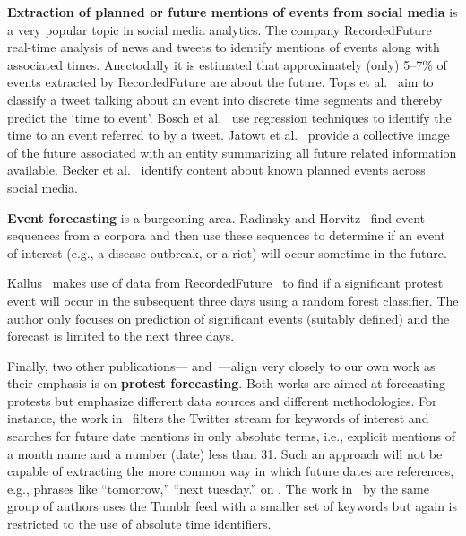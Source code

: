 {\bf Extraction of planned or future mentions of events from social media} is a very popular topic in social media
analytics.
The company 
RecordedFuture~\cite{recordedFuture}  real-time analysis of news and tweets to identify mentions of events along with associated times. Anectodally it is estimated that approximately (only) 5--7\% of events extracted 
by RecordedFuture are about the future.
Tops et al.~\cite{tops2013predicting} aim to classify a tweet talking about an event into discrete time segments and thereby predict the 
`time to event'.
Bosch et al.~\cite{bosch2013estm} use regression techniques to identify the time to an event referred to by a tweet.
Jatowt et al.~\cite{Jatowt:2011:ECE} provide a collective image of the future associated with an entity summarizing all future related information available.
Becker et al.~\cite{Becker:2012:ICP} identify content about known planned events across social media.

{\bf Event forecasting} is a burgeoning area. 
Radinsky and Horvitz~\cite{Radinsky:2013:MWP} find event sequences from a corpora and then use these sequences to determine if 
an event of interest (e.g., a disease outbreak, or a riot)
will occur sometime in the future.
\iffalse They only predict if an event of interest will happen in the future given the sequence of events seen but do not predict when/where(city level resolution) that event will happen \fi
Kallus~\cite{nathankallus} makes use of data from RecordedFuture~\cite{recordedFuture} to find if a  significant protest event will occur in 
the subsequent three days using a random forest classifier.
The author only focuses on prediction of significant events (suitably defined) and
the forecast is limited to the next three days.

Finally, two other publications---\cite{compton2013detecting} and~\cite{xu2014civil}---align very
closely to our own work as their emphasis is on {\bf protest forecasting}.
Both works are aimed at forecasting protests
but emphasize different data sources and different methodologies. For instance, the work in~\cite{compton2013detecting} filters the Twitter stream for
keywords of interest and searches for future date mentions in only absolute terms, i.e., explicit mentions of a month name and a number (date)
less than 31. 
Such an approach will not be capable of extracting the more
common way in which future dates are references, e.g., phrases like
``tomorrow,'' ``next tuesday.'' 
on \cite{hrlgeocoder}. The work in~\cite{xu2014civil} by the same group of authors uses the Tumblr feed with a smaller set of keywords but
again is restricted to the use of absolute time identifiers.


